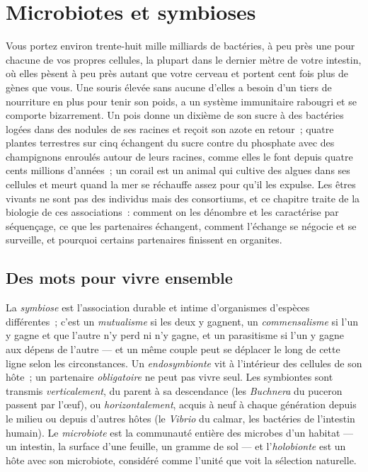 \chapter{Microbiotes et symbioses}\label{ch:b3:microbiomes}

Vous portez environ trente-huit mille milliards de bactéries, à peu
près une pour chacune de vos propres cellules, la plupart dans le
dernier mètre de votre intestin, où elles pèsent à peu près autant que
votre cerveau et portent cent fois plus de gènes que vous. Une souris
élevée sans aucune d'elles a besoin d'un tiers de nourriture en plus
pour tenir son poids, a un système immunitaire rabougri et se comporte
bizarrement. Un pois donne un dixième de son sucre à des bactéries
logées dans des nodules de ses racines et reçoit son azote en retour~;
quatre plantes terrestres sur cinq échangent du sucre contre du
phosphate avec des champignons enroulés autour de leurs racines, comme
elles le font depuis quatre cents millions d'années~; un corail est un
animal qui cultive des algues dans ses cellules et meurt quand la mer
se réchauffe assez pour qu'il les expulse. Les êtres vivants ne sont pas
des individus mais des consortiums, et ce chapitre traite de la
biologie de ces associations~: comment on les dénombre et les
caractérise par séquençage, ce que les partenaires échangent, comment
l'échange se négocie et se surveille, et pourquoi certains partenaires
finissent en organites.

\section{Des mots pour vivre ensemble}

\begin{definition}[La symbiose]\label{def:b3:microbiomes:symbiosis}
La \emph{symbiose} est l'association durable et intime d'organismes
d'espèces différentes~; c'est un \emph{mutualisme} si les deux y
gagnent, un \emph{commensalisme} si l'un y gagne et que l'autre n'y
perd ni n'y gagne, et un parasitisme si l'un y gagne aux dépens de
l'autre --- et un même couple peut se déplacer le long de cette ligne
selon les circonstances. Un \emph{endosymbionte} vit à l'intérieur des
cellules de son hôte~; un partenaire \emph{obligatoire} ne peut pas
vivre seul. Les symbiontes sont transmis \emph{verticalement}, du
parent à sa descendance (les \emph{Buchnera} du puceron passent par
l'œuf), ou \emph{horizontalement}, acquis à neuf à chaque génération
depuis le milieu ou depuis d'autres hôtes (le \emph{Vibrio} du calmar,
les bactéries de l'intestin humain). Le \emph{microbiote} est la
communauté entière des microbes d'un habitat --- un intestin, la
surface d'une feuille, un gramme de sol --- et l'\emph{holobionte} est
un hôte avec son microbiote, considéré comme l'unité que voit la
sélection naturelle.
\end{definition}

